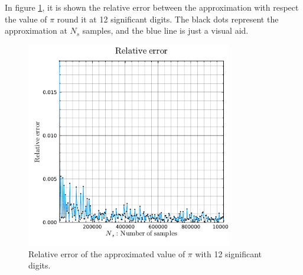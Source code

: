 \documentclass[main.tex]{subfiles}
\begin{document}
In figure \ref{fig6:relativeErrorMonteCarlo}, it is shown the relative error between the approximation with respect the value of $\pi$ round it at 12 significant digits.
The black dots represent the approximation at $N_s$ samples, and the blue line is just a visual aid.

\begin{figure}[ht!]
    \centering
    \includegraphics[width=0.8\textwidth]{imgs/hw6/relativeError.pdf}
    \caption{
        Relative error of the approximated value of $\pi$ with 12 significant digits.
    }
    \label{fig6:relativeErrorMonteCarlo}
\end{figure}


    
\end{document}
